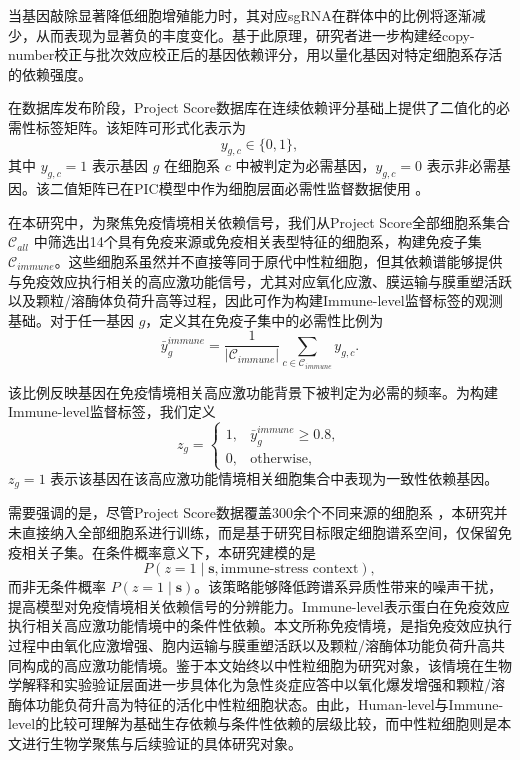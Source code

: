 当基因敲除显著降低细胞增殖能力时，其对应sgRNA在群体中的比例将逐渐减少，从而表现为显著负的丰度变化。基于此原理，研究者进一步构建经copy-number校正与批次效应校正后的基因依赖评分，用以量化基因对特定细胞系存活的依赖强度。

在数据库发布阶段，Project Score数据库在连续依赖评分基础上提供了二值化的必需性标签矩阵。该矩阵可形式化表示为
\begin{equation}
    y_{g,c} \in \{0,1\},
\end{equation}
其中 $y_{g,c}=1$ 表示基因 $g$ 在细胞系 $c$ 中被判定为必需基因，$y_{g,c}=0$ 表示非必需基因。该二值矩阵已在PIC模型中作为细胞层面必需性监督数据使用 \cite{kang2024comprehensive}。

在本研究中，为聚焦免疫情境相关依赖信号，我们从Project Score全部细胞系集合 $\mathcal{C}_{all}$ 中筛选出14个具有免疫来源或免疫相关表型特征的细胞系，构建免疫子集 $\mathcal{C}_{immune}$。这些细胞系虽然并不直接等同于原代中性粒细胞，但其依赖谱能够提供与免疫效应执行相关的高应激功能信号，尤其对应氧化应激、膜运输与膜重塑活跃以及颗粒/溶酶体负荷升高等过程，因此可作为构建Immune-level监督标签的观测基础。对于任一基因 $g$，定义其在免疫子集中的必需性比例为
\begin{equation}
    \bar{y}_g^{immune}
    =
    \frac{1}{|\mathcal{C}_{immune}|}
    \sum_{c \in \mathcal{C}_{immune}}
    y_{g,c}.
\end{equation}

该比例反映基因在免疫情境相关高应激功能背景下被判定为必需的频率。为构建Immune-level监督标签，我们定义
\begin{equation}
    z_g=
    \begin{cases}
    1, & \bar{y}_g^{immune} \ge 0.8,\\
    0, & \text{otherwise},
    \end{cases}
\end{equation}
$z_g=1$ 表示该基因在该高应激功能情境相关细胞集合中表现为一致性依赖基因。

需要强调的是，尽管Project Score数据覆盖300余个不同来源的细胞系 \cite{behan2019prioritization}，本研究并未直接纳入全部细胞系进行训练，而是基于研究目标限定细胞谱系空间，仅保留免疫相关子集。在条件概率意义下，本研究建模的是
\begin{equation}
    P(z=1 \mid \mathbf{s}, \text{immune-stress context}),
\end{equation}
而非无条件概率 $P(z=1 \mid \mathbf{s})$。该策略能够降低跨谱系异质性带来的噪声干扰，提高模型对免疫情境相关依赖信号的分辨能力。Immune-level表示蛋白在免疫效应执行相关高应激功能情境中的条件性依赖。本文所称免疫情境，是指免疫效应执行过程中由氧化应激增强、胞内运输与膜重塑活跃以及颗粒/溶酶体功能负荷升高共同构成的高应激功能情境。鉴于本文始终以中性粒细胞为研究对象，该情境在生物学解释和实验验证层面进一步具体化为急性炎症应答中以氧化爆发增强和颗粒/溶酶体功能负荷升高为特征的活化中性粒细胞状态。由此，Human-level与Immune-level的比较可理解为基础生存依赖与条件性依赖的层级比较，而中性粒细胞则是本文进行生物学聚焦与后续验证的具体研究对象。

